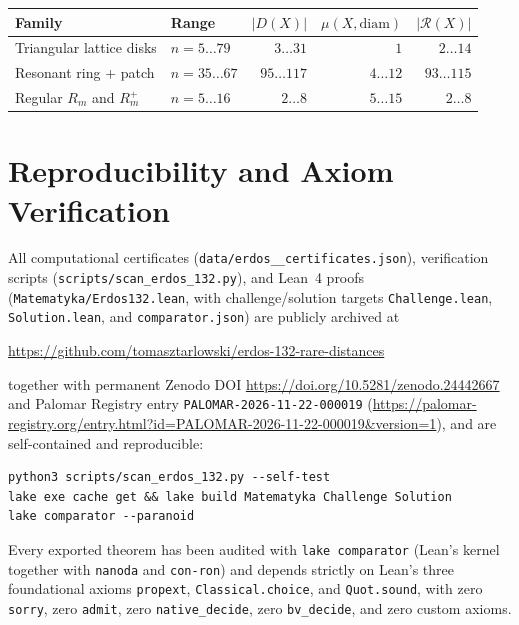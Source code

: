 \documentclass[11pt,reqno]{amsart}
\theoremstyle{definition}
\newcommand{\card}[1]{|#1|}
\begin{document}
\begin{center}
\footnotesize
\begin{tabular}{llrrr}
\toprule
Family & Range & $\card{D(X)}$ & $\mu(X, \mathrm{diam})$ & $\card{\mathcal{R}(X)}$ \\
\midrule
Triangular lattice disks & $n = 5 \dots 79$ & $3 \dots 31$ & $1$ & $2 \dots 14$ \\
Resonant ring + patch & $n = 35 \dots 67$ & $95 \dots 117$ & $4 \dots 12$ & $93 \dots 115$ \\
Regular $R_m$ and $R_m^+$ & $n = 5 \dots 16$ & $2 \dots 8$ & $5 \dots 15$ & $2 \dots 8$ \\
\bottomrule
\end{tabular}
\end{center}

\section{Reproducibility and Axiom Verification}

All computational certificates (\texttt{data/\allowbreak erdos\_\_\allowbreak certificates.json}), verification scripts (\texttt{scripts/\allowbreak scan\_\allowbreak erdos\_\allowbreak 132.py}), and Lean~4 proofs (\texttt{Matematyka/\allowbreak Erdos132.lean}, with challenge/solution targets \texttt{Challenge.lean}, \texttt{Solution.lean}, and \texttt{comparator.json}) are publicly archived at
\begin{center}
\url{https://github.com/tomasztarlowski/erdos-132-rare-distances}
\end{center}
together with permanent Zenodo DOI \url{https://doi.org/10.5281/zenodo.24442667} and Palomar Registry entry \texttt{PALOMAR-2026-11-22-000019} (\url{https://palomar-registry.org/entry.html?id=PALOMAR-2026-11-22-000019&version=1}), and are self-contained and reproducible:
\begin{verbatim}
python3 scripts/scan_erdos_132.py --self-test
lake exe cache get && lake build Matematyka Challenge Solution
lake comparator --paranoid
\end{verbatim}
Every exported theorem has been audited with \texttt{lake comparator} (Lean's kernel together with \texttt{nanoda} and \texttt{con-ron}) and depends strictly on Lean's three foundational axioms \texttt{propext}, \texttt{Classical.choice}, and \texttt{Quot.sound}, with zero \texttt{sorry}, zero \texttt{admit}, zero \texttt{native\_decide}, zero \texttt{bv\_decide}, and zero custom axioms.
\end{document}
